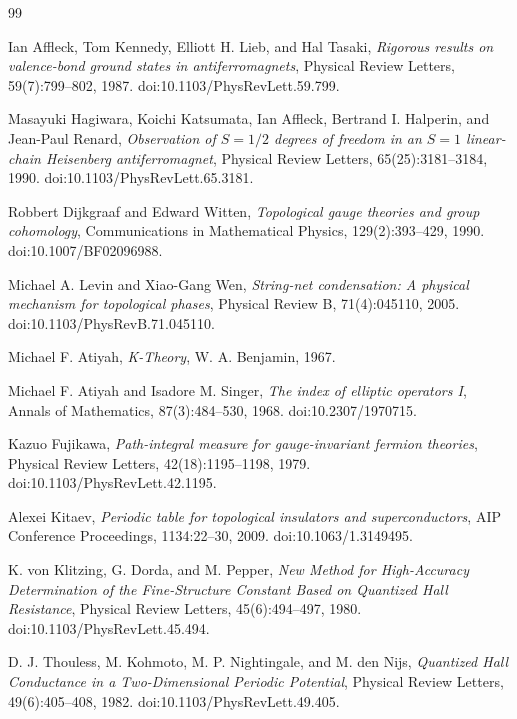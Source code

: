 \documentclass{article}
\begin{document}
\begin{thebibliography}{99}

Ian Affleck, Tom Kennedy, Elliott H. Lieb, and Hal Tasaki,
\textit{Rigorous results on valence-bond ground states in antiferromagnets},
Physical Review Letters, 59(7):799--802, 1987.
doi:10.1103/PhysRevLett.59.799.

Masayuki Hagiwara, Koichi Katsumata, Ian Affleck, Bertrand I. Halperin,
and Jean-Paul Renard,
\textit{Observation of $S=1/2$ degrees of freedom in an $S=1$ linear-chain
Heisenberg antiferromagnet},
Physical Review Letters, 65(25):3181--3184, 1990.
doi:10.1103/PhysRevLett.65.3181.

Robbert Dijkgraaf and Edward Witten,
\textit{Topological gauge theories and group cohomology},
Communications in Mathematical Physics, 129(2):393--429, 1990.
doi:10.1007/BF02096988.

Michael A. Levin and Xiao-Gang Wen,
\textit{String-net condensation: A physical mechanism for topological
phases},
Physical Review B, 71(4):045110, 2005.
doi:10.1103/PhysRevB.71.045110.

Michael F. Atiyah,
\textit{K-Theory},
W. A. Benjamin, 1967.

Michael F. Atiyah and Isadore M. Singer,
\textit{The index of elliptic operators I},
Annals of Mathematics, 87(3):484--530, 1968.
doi:10.2307/1970715.

Kazuo Fujikawa,
\textit{Path-integral measure for gauge-invariant fermion theories},
Physical Review Letters, 42(18):1195--1198, 1979.
doi:10.1103/PhysRevLett.42.1195.

Alexei Kitaev,
\textit{Periodic table for topological insulators and superconductors},
AIP Conference Proceedings, 1134:22--30, 2009.
doi:10.1063/1.3149495.

K. von Klitzing, G. Dorda, and M. Pepper,
\textit{New Method for High-Accuracy Determination of the Fine-Structure
Constant Based on Quantized Hall Resistance},
Physical Review Letters, 45(6):494--497, 1980.
doi:10.1103/PhysRevLett.45.494.

D. J. Thouless, M. Kohmoto, M. P. Nightingale, and M. den Nijs,
\textit{Quantized Hall Conductance in a Two-Dimensional Periodic Potential},
Physical Review Letters, 49(6):405--408, 1982.
doi:10.1103/PhysRevLett.49.405.


\end{thebibliography}
\end{document}
